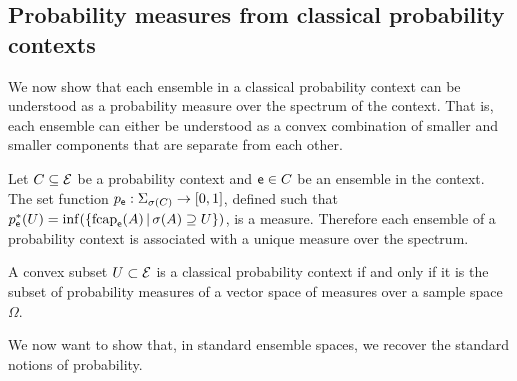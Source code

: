 \subsection{Probability measures from classical probability contexts}

We now show that each ensemble in a classical probability context can be understood as a probability measure over the spectrum of the context. That is, each ensemble can either be understood as a convex combination of smaller and smaller components that are separate from each other.

\begin{mathSection}
	\begin{conj}
		Let $C \subseteq \mathcal{E}$ be a probability context and $\mathsf{e} \in C$ be an ensemble in the context. The set function $p_{\mathsf{e}} : \Sigma_{\sigma(C)} \to[0,1]$, defined such that $p^*_{\mathsf{e}}(U) = \inf(\{ \mathrm{fcap}_{\mathsf{e}}(A) \, | \, \sigma(A) \supseteq U \})$, is a measure. Therefore each ensemble of a probability context is associated with a unique measure over the spectrum.
	\end{conj}
\end{mathSection}

\begin{conj}
	A convex subset $U \subset \mathcal{E}$ is a classical probability context if and only if it is the subset of probability measures of a vector space of measures over a sample space $\Omega$.
\end{conj}

We now want to show that, in standard ensemble spaces, we recover the standard notions of probability.


